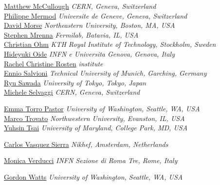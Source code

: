 \noindent\href{mailto:matthew.mccullough@cern.ch}{Matthew McCullough}
\emph{CERN, Geneva, Switzerland}\\

\noindent\href{mailto:philippe.mermod@cern.ch}{Philippe Mermod}
\emph{Universite de Geneve, Geneva, Switzerland}\\

\noindent\href{mailto:david.michael.morse@cern.ch}{David Morse}
\emph{Northeastern University, Boston, MA, USA}\\

\noindent\href{mailto:mrenna@fnal.gov}{Stephen Mrenna}
\emph{Fermilab, Batavia, IL, USA}\\

\noindent\href{mailto:christian.ohm@cern.ch}{Christian Ohm}
\emph{KTH Royal Institute of Technology, Stockholm, Sweden}\\

\noindent\href{mailto:hideyuki.oide@cern.ch}{Hideyuki Oide}
\emph{INFN e Universita Genova, Genova, Italy}\\

\noindent\href{mailto:rachel.rosten@cern.ch}{Rachel Christine Rosten}
\emph{institute}\\

\noindent\href{mailto:ennio.salvioni@tum.de}{Ennio Salvioni}
\emph{Technical University of Munich, Garching, Germany}\\

\noindent\href{mailto:ryu.sawada@cern.ch}{Ryu Sawada}
\emph{University of Tokyo, Tokyo, Japan}\\

\noindent\href{mailto:Michele.Selvaggi@cern.ch}{Michele Selvaggi}
\emph{CERN, Geneva, Switzerland}

\noindent\href{mailto:emma.torro.pastor@cern.ch}{Emma Torro Pastor}
\emph{University of Washington, Seattle, WA, USA}\\

\noindent\href{mailto:marco.trovato@northwestern.edu}{Marco Trovato}
\emph{Northwestern University, Evanston, IL, USA}\\

\noindent\href{mailto:yhtsai@ucdavis.edu}{Yuhsin Tsai}
\emph{University of Maryland, College Park, MD, USA}

\noindent\href{mailto:carlos.vazquez@cern.ch}{Carlos Vasquez Sierra}
\emph{Nikhef, Amsterdam, Netherlands}

\noindent\href{mailto:monica.verducci@cern.ch}{Monica Verducci}
\emph{INFN Sezione di Roma Tre, Rome, Italy}

\noindent\href{mailto:gwatts@uw.edu}{Gordon Watts}
\emph{University of Washington, Seattle, WA, USA}\\






